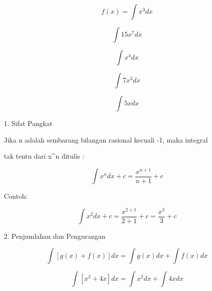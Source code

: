 \documentclass[a4paper,10pt]{article}
\begin{document}
\begin{eulernotebook}
\begin{eulercomment}
\begin{eulercomment}
\begin{eulercomment}
\begin{eulercomment}
\begin{eulercomment}
\end{eulercomment}
\begin{eulerformula}
\[
f(x)= \int x^3 dx
\]
\end{eulerformula}
\begin{eulerformula}
\[
\int 15x^7 dx
\]
\end{eulerformula}
\begin{eulerformula}
\[
\int x^4 dx
\]
\end{eulerformula}
\begin{eulerformula}
\[
\int 7x^3 dx
\]
\end{eulerformula}
\begin{eulerformula}
\[
\int 5x dx
\]
\end{eulerformula}
\begin{eulercomment}
\end{eulercomment}
\begin{eulercomment}
1. Sifat Pangkat\\
\end{eulercomment}
\begin{eulerttcomment}
   Jika n adalah sembarang bilangan rasional kecuali -1, maka integral
\end{eulerttcomment}
\begin{eulercomment}
tak tentu dari x\textasciicircum{}n ditulis :\\
\end{eulercomment}
\begin{eulerformula}
\[
\int x^n dx+c=\frac{x^{n+1}}{n+1} +c
\]
\end{eulerformula}
\begin{eulercomment}
Contoh:\\
\end{eulercomment}
\begin{eulerformula}
\[
\int x^2 dx+c=\frac{x^{2+1}}{2+1} +c =\frac{x^3}{3} +c
\]
\end{eulerformula}
\begin{eulercomment}
2. Penjumlahan dan Pengurangan\\
\end{eulercomment}
\begin{eulerformula}
\[
\int[g(x)+f(x)]dx = \int g(x) dx + \int f(x)dx
\]
\end{eulerformula}
\begin{eulerformula}
\[
\int [x^2+4x] dx = \int x^2 dx + \int 4x dx
\]
\end{eulerformula}
\begin{eulerformula}

\end{eulerformula}
\end{eulercomment}
\end{eulercomment}
\end{eulercomment}
\end{eulercomment}
\end{eulernotebook}
\end{document}
